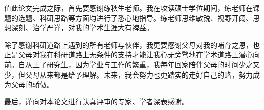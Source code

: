 \begin{thanks}
值此论文完成之际，首先要感谢练秋生老师。我在攻读硕士学位期间，练老师在课题的选题、科研思路等方面均进行了悉心地指导。练老师思维敏锐、视野开阔、思想深刻、治学严谨，对我的学术生涯大有裨益。

除了感谢科研道路上遇到的所有老师与伙伴，我更要感谢父母对我的哺育之恩，也正是父母对我在科研道路上无条件的支持才能让我心无旁骛地在学术道路上潜心向前。自从上了研究生，因为学业与工作的繁重，我每年回家陪伴父母的时间少之又少，但父母从来都是给予理解。未来，我会努力也更踏实的走好自己的路，努力成为父母的骄傲。

最后，谨向对本论文进行认真评审的专家、学者深表感谢。


\end{thanks}
